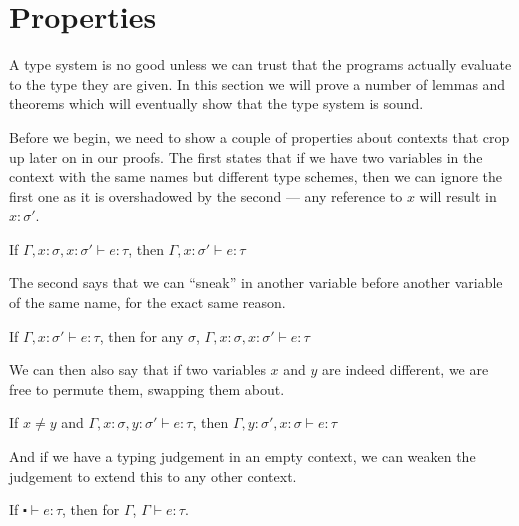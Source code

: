 \chapter{Properties}\label{cha:properties}
A type system is no good unless we can trust that the programs
actually evaluate to the type they are given. In this section we
will prove a number of lemmas and theorems which will eventually show
that the type system is sound.

Before we begin, we need to show a couple of properties about contexts
that crop up later on in our proofs. The first states that if we have
two variables in the context with the same names but different type
schemes, then we can ignore the first one as it is overshadowed by the
second --- any reference to $x$ will result in $x : \sigma'$.
\begin{lemma}[Drop]\label{lem:drop}
  If $\Gamma , x : \sigma, x : \sigma' \vdash e : \tau$, then $\Gamma , x : \sigma' \vdash e : \tau$
\end{lemma}
The second says that we can ``sneak'' in another variable before another
variable of the same name, for the exact same reason.
\begin{lemma}[Sneak]\label{lem:sneak}
  If $\Gamma , x : \sigma' \vdash e : \tau$, then for any $\sigma$, $\Gamma , x : \sigma, x : \sigma' \vdash e : \tau$
\end{lemma}
We can then also say that if two variables $x$ and $y$ are indeed
different, we are free to permute them, swapping them about.
\begin{lemma}[Swap]\label{lem:swap}
  If $x \neq y$ and $\Gamma , x : \sigma, y : \sigma' \vdash e : \tau$, then $\Gamma , y : \sigma' , x : \sigma \vdash e
  : \tau$
\end{lemma}
And if we have a typing judgement in an empty context, we can weaken
the judgement to extend this to any other context.
\begin{lemma}[Weaken]\label{lem:weaken}
  If $\centerdot \vdash e : \tau$, then for $\Gamma$, $\Gamma \vdash e : \tau$.
\end{lemma}

